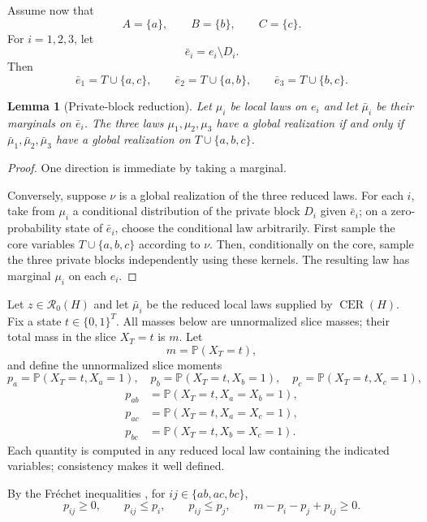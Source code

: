 \documentclass[11pt]{article}
\newtheorem{lemma}[theorem]{Lemma}
\theoremstyle{definition}
\theoremstyle{remark}
\newcommand{\CER}{\operatorname{CER}}
\newcommand{\Rdist}{\mathcal{R}_{0}}
\newcommand{\Prob}{\mathbb{P}}
\begin{document}
\begin{editedaiblock}
Assume now that
\[
A=\{a\},\qquad B=\{b\},\qquad C=\{c\}.
\]
For $i=1,2,3$, let
\[
\bar e_i=e_i\setminus D_i.
\]
Then
\[
\bar e_1=T\cup\{a,c\},\qquad
\bar e_2=T\cup\{a,b\},\qquad
\bar e_3=T\cup\{b,c\}.
\]

\begin{lemma}[Private-block reduction]\label{lem:private}
Let $\mu_i$ be local laws on $e_i$ and let $\bar\mu_i$ be their marginals on $\bar e_i$. The three laws $\mu_1,\mu_2,\mu_3$ have a global realization if and only if $\bar\mu_1,\bar\mu_2,\bar\mu_3$ have a global realization on $T\cup\{a,b,c\}$.
\end{lemma}

\begin{proof}
One direction is immediate by taking a marginal.

Conversely, suppose $\nu$ is a global realization of the three reduced laws. For each $i$, take from $\mu_i$ a conditional distribution of the private block $D_i$ given $\bar e_i$; on a zero-probability state of $\bar e_i$, choose the conditional law arbitrarily. First sample the core variables $T\cup\{a,b,c\}$ according to $\nu$. Then, conditionally on the core, sample the three private blocks independently using these kernels. The resulting law has marginal $\mu_i$ on each $e_i$.
\end{proof}

Let $z\in\Rdist(H)$ and let $\bar\mu_i$ be the reduced local laws supplied by $\CER(H)$. Fix a state $t\in\{0,1\}^T$. All masses below are unnormalized slice masses; their total mass in the
slice $X_T=t$ is $m$. Let
\[
m=\Prob(X_T=t),
\]
and define the unnormalized slice moments
\[
p_a=\Prob(X_T=t,X_a=1),\quad
p_b=\Prob(X_T=t,X_b=1),\quad
p_c=\Prob(X_T=t,X_c=1),
\]
\begin{align*}
p_{ab}&=\Prob(X_T=t,X_a=X_b=1),\\
p_{ac}&=\Prob(X_T=t,X_a=X_c=1),\\
p_{bc}&=\Prob(X_T=t,X_b=X_c=1).
\end{align*}
Each quantity is computed in any reduced local law containing the indicated variables; consistency makes it well defined.

By the Fr\'{e}chet inequalities \cite{frechet1935generalisation}, for $ij\in\{ab,ac,bc\}$,
\begin{equation}\label{eq:pair-frechet}
p_{ij}\ge0,\qquad p_{ij}\le p_i,\qquad p_{ij}\le p_j,\qquad m-p_i-p_j+p_{ij}\ge0.
\end{equation}


\end{editedaiblock}
\end{document}
